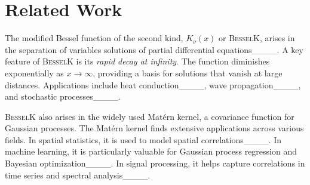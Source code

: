 \section{Related Work}


The modified Bessel function of the second kind, \( K_\nu(x) \) or \textsc{BesselK}, arises in the separation of variables solutions of partial differential equations____. A key feature of \textsc{BesselK} is its \textit{rapid decay at infinity}. The function diminishes exponentially as \( x \to \infty \), providing a basis for solutions that vanish at large distances. Applications include heat conduction____, wave propagation____, and stochastic processes____.


\textsc{BesselK} also arises in the widely used Mat\'{e}rn kernel, a covariance function for Gaussian processes. The Mat\'{e}rn kernel finds extensive applications across various fields. In spatial statistics, it is used to model spatial correlations____. In machine learning, it is particularly valuable for Gaussian process regression and Bayesian optimization____. In signal processing, it helps capture correlations in time series and spectral analysis____. 
 

